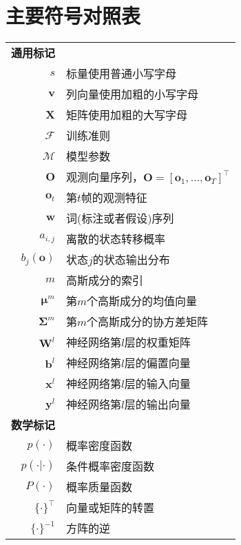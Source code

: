 \chapter{主要符号对照表}
\label{chap:symb}

\begin{longtable}{rl}
\textbf{通用标记} \\
$s$ & 标量使用普通小写字母 \\
$\mathbf{v}$ & 列向量使用加粗的小写字母 \\
$\mathbf{X}$ & 矩阵使用加粗的大写字母 \\
$\mathcal{F}$ & 训练准则 \\
$\mathcal{M}$ & 模型参数 \\
$\mathbf{O}$ & 观测向量序列，$\mathbf{O}=[ \mathbf{o}_1, \dots, \mathbf{o}_T ]^\top$ \\
$\mathbf{o}_t$ & 第$t$帧的观测特征 \\
$\mathbf{w}$ & 词(标注或者假设)序列 \\
$a_{i,j}$ & 离散的状态转移概率 \\
$b_j(\mathbf{o})$ & 状态$j$的状态输出分布 \\
$m$ & 高斯成分的索引 \\
$\bm{\mu}^{m}$ & 第$m$个高斯成分的均值向量 \\
$\bm{\Sigma}^{m}$ & 第$m$个高斯成分的协方差矩阵 \\
$\mathbf{W}^l$ & 神经网络第$l$层的权重矩阵 \\
$\mathbf{b}^l$ & 神经网络第$l$层的偏置向量 \\
$\mathbf{x}^l$ & 神经网络第$l$层的输入向量 \\
$\mathbf{y}^l$ & 神经网络第$l$层的输出向量 \\

\textbf{数学标记} \\
$p(\cdot)$ & 概率密度函数 \\
$p(\cdot|\cdot)$ & 条件概率密度函数 \\
$P(\cdot)$ & 概率质量函数 \\
$\{ \cdot \}^{\top}$ & 向量或矩阵的转置 \\
$\{ \cdot \}^{-1}$ & 方阵的逆 \\



\end{longtable}
